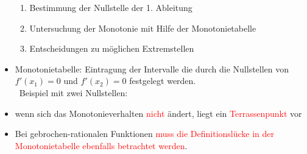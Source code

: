 \documentclass[a4paper,twocolumn,10pt]{onepgnote1}
\renewcommand\mynote{\notebox{Hinweis:}\ }  %
\begin{document}
\begin{itemize}
 \begin{enumerate}
     \item Bestimmung der Nullstelle der 1. Ableitung\\
     \item Untersuchung der Monotonie mit Hilfe der Monotonietabelle\\
     \item Entscheidungen zu möglichen Extremstellen
 \end{enumerate}
 \item Monotonietabelle: Eintragung der Intervalle die durch die Nullstellen von $f'(x_1)= 0$ und $f'(x_2)=0$ festgelegt werden.\\
\mynote Beispiel mit zwei Nullstellen:\\
\item wenn sich das Monotonieverhalten \textcolor{red}{nicht} ändert, liegt ein \textcolor{red}{Terrassenpunkt} vor 
\item Bei gebrochen-rationalen Funktionen \textcolor{red} {muss die Definitionslücke in der Monotonietabelle ebenfalls betrachtet werden}.
 \end{itemize}
\end{document}
